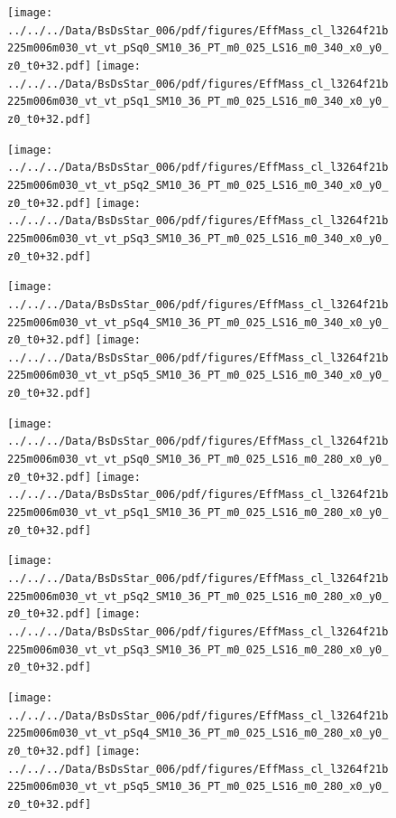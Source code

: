 \documentclass[a4paper,10pt]{article}
\begin{document}
\begin{figure}[p]
 \texttt{[image: ../../../Data/BsDsStar\_006/pdf/figures/EffMass\_cl\_l3264f21b225m006m030\_vt\_vt\_pSq0\_SM10\_36\_PT\_m0\_025\_LS16\_m0\_340\_x0\_y0\_z0\_t0+32.pdf]} 
 \texttt{[image: ../../../Data/BsDsStar\_006/pdf/figures/EffMass\_cl\_l3264f21b225m006m030\_vt\_vt\_pSq1\_SM10\_36\_PT\_m0\_025\_LS16\_m0\_340\_x0\_y0\_z0\_t0+32.pdf]} 
 \end{figure}
\begin{figure}[p]
 \texttt{[image: ../../../Data/BsDsStar\_006/pdf/figures/EffMass\_cl\_l3264f21b225m006m030\_vt\_vt\_pSq2\_SM10\_36\_PT\_m0\_025\_LS16\_m0\_340\_x0\_y0\_z0\_t0+32.pdf]} 
 \texttt{[image: ../../../Data/BsDsStar\_006/pdf/figures/EffMass\_cl\_l3264f21b225m006m030\_vt\_vt\_pSq3\_SM10\_36\_PT\_m0\_025\_LS16\_m0\_340\_x0\_y0\_z0\_t0+32.pdf]} 
 \end{figure}
\begin{figure}[p]
 \texttt{[image: ../../../Data/BsDsStar\_006/pdf/figures/EffMass\_cl\_l3264f21b225m006m030\_vt\_vt\_pSq4\_SM10\_36\_PT\_m0\_025\_LS16\_m0\_340\_x0\_y0\_z0\_t0+32.pdf]} 
 \texttt{[image: ../../../Data/BsDsStar\_006/pdf/figures/EffMass\_cl\_l3264f21b225m006m030\_vt\_vt\_pSq5\_SM10\_36\_PT\_m0\_025\_LS16\_m0\_340\_x0\_y0\_z0\_t0+32.pdf]} 
 \end{figure}
\clearpage
\begin{figure}[p]
 \texttt{[image: ../../../Data/BsDsStar\_006/pdf/figures/EffMass\_cl\_l3264f21b225m006m030\_vt\_vt\_pSq0\_SM10\_36\_PT\_m0\_025\_LS16\_m0\_280\_x0\_y0\_z0\_t0+32.pdf]} 
 \texttt{[image: ../../../Data/BsDsStar\_006/pdf/figures/EffMass\_cl\_l3264f21b225m006m030\_vt\_vt\_pSq1\_SM10\_36\_PT\_m0\_025\_LS16\_m0\_280\_x0\_y0\_z0\_t0+32.pdf]} 
 \end{figure}
\begin{figure}[p]
 \texttt{[image: ../../../Data/BsDsStar\_006/pdf/figures/EffMass\_cl\_l3264f21b225m006m030\_vt\_vt\_pSq2\_SM10\_36\_PT\_m0\_025\_LS16\_m0\_280\_x0\_y0\_z0\_t0+32.pdf]} 
 \texttt{[image: ../../../Data/BsDsStar\_006/pdf/figures/EffMass\_cl\_l3264f21b225m006m030\_vt\_vt\_pSq3\_SM10\_36\_PT\_m0\_025\_LS16\_m0\_280\_x0\_y0\_z0\_t0+32.pdf]} 
 \end{figure}
\begin{figure}[p]
 \texttt{[image: ../../../Data/BsDsStar\_006/pdf/figures/EffMass\_cl\_l3264f21b225m006m030\_vt\_vt\_pSq4\_SM10\_36\_PT\_m0\_025\_LS16\_m0\_280\_x0\_y0\_z0\_t0+32.pdf]} 
 \texttt{[image: ../../../Data/BsDsStar\_006/pdf/figures/EffMass\_cl\_l3264f21b225m006m030\_vt\_vt\_pSq5\_SM10\_36\_PT\_m0\_025\_LS16\_m0\_280\_x0\_y0\_z0\_t0+32.pdf]} 
 \end{figure}
\clearpage
\clearpage
\end{document}

